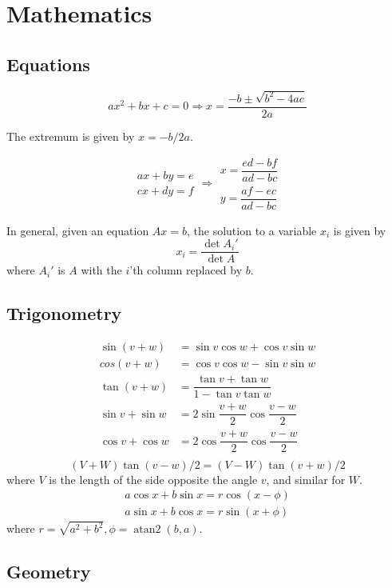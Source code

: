
\chapter{Mathematics}

\section{Equations}
\[ax^2+bx+c=0 \Rightarrow x = \frac{-b\pm\sqrt{b^2-4ac}}{2a}\]

The extremum is given by $x = -b/2a$.

\[\begin{aligned}ax+by=e\\cx+dy=f\end{aligned}
\Rightarrow
\begin{aligned}x=\dfrac{ed-bf}{ad-bc}\\y=\dfrac{af-ec}{ad-bc}\end{aligned}\]

In general, given an equation $Ax = b$, the solution to a variable $x_i$ is given by
\[x_i = \frac{\det A_i'}{\det A} \]
where $A_i'$ is $A$ with the $i$'th column replaced by $b$.

\section{Trigonometry}
\begin{align*}
\sin(v+w)&{}=\sin v\cos w+\cos v\sin w\\
cos(v+w)&{}=\cos v\cos w-\sin v\sin w\\
\tan(v+w)&{}=\dfrac{\tan v+\tan w}{1-\tan v\tan w}\\
\sin v+\sin w&{}=2\sin\dfrac{v+w}{2}\cos\dfrac{v-w}{2}\\
\cos v+\cos w&{}=2\cos\dfrac{v+w}{2}\cos\dfrac{v-w}{2}\\
\end{align*}
\[ (V+W)\tan(v-w)/2{}=(V-W)\tan(v+w)/2 \]
where $V$ is the length of the side opposite the angle $v$, and
similar for $W$.
\begin{align*}
a\cos x+b\sin x=r\cos(x-\phi)\\
a\sin x+b\cos x=r\sin(x+\phi)
\end{align*}
where $r=\sqrt{a^2+b^2}, \phi=\operatorname{atan2}(b,a)$.

\section{Geometry}

